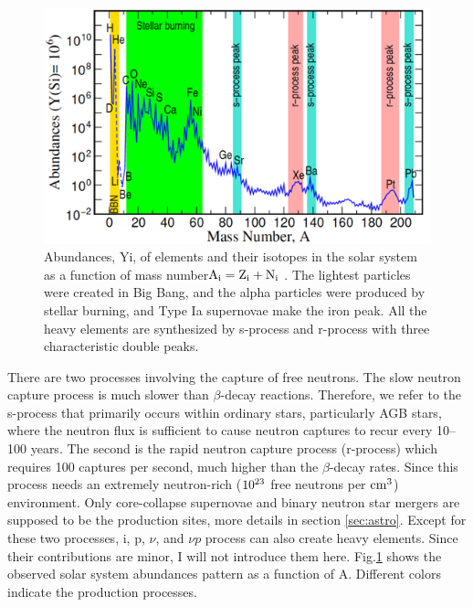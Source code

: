 \documentclass[aps,prl,preprint,groupedaddress]{revtex4}
\begin{document}
\begin{figure}
\centering
\includegraphics[scale=0.6]{solar_abunds}
\caption{
Abundances, Yi, of elements and their isotopes in the solar system as a function of mass number$\rm{A_i = Z_i + N_i}$ \cite{RevModPhys.93.015002}. The lightest particles were created in Big Bang, and the alpha particles were produced by stellar burning, and Type Ia supernovae make the iron peak. All the heavy elements are synthesized by s-process and r-process with three characteristic double peaks.
} 
\label{fig:solar_abunds}
\end{figure}
There are two processes involving the capture of free neutrons. The slow neutron capture process is much slower than $\beta$-decay reactions. Therefore, we refer to the s-process that primarily occurs within ordinary stars, particularly AGB stars, where the neutron flux is sufficient to cause neutron captures to recur every 10–100 years. The second is the rapid neutron capture process (r-process) which requires 100 captures per second, much higher than the $\beta$-decay rates. Since this process needs an extremely neutron-rich ($\rm{10^{23}}$ free neutrons per $\rm{cm^3}$)\cite{1957RvMP...29..547B} environment. Only core-collapse supernovae and binary neutron star mergers are supposed to be the production sites, more details in section \ref{sec:astro}. Except for these two processes, i, p, $\nu$, and $\nu p$ process can also create heavy elements. Since their contributions are minor, I will not introduce them here. Fig.\ref{fig:solar_abunds} shows the observed solar system abundances pattern as a function of A. Different colors indicate the production processes.  
\end{document}
